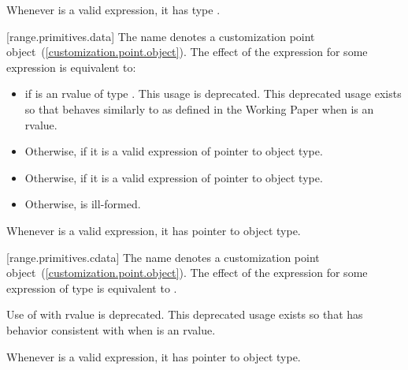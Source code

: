 \pnum
\enternote Whenever  is a valid expression, it
has type . \exitnote

[range.primitives.data]{}
\pnum
The name  denotes a customization point
object~(\ref{customization.point.object}). The effect of the expression
 for some expression  is
equivalent to:

\begin{itemize}
\item
   if  is an rvalue of
  type . This usage is deprecated. \enternote
  This deprecated usage exists so that  behaves
  similarly to  as defined in the \Cpp Working
  Paper when  is an rvalue. \exitnote

\item
  Otherwise,  if it is a valid expression of pointer to object type.

\item
  Otherwise,  if it is a valid expression of pointer to object type.

\item
  Otherwise,  is ill-formed.
\end{itemize}

\pnum
\enternote Whenever  is a valid expression, it
has pointer to object type. \exitnote

[range.primitives.cdata]{}
\pnum
The name  denotes a customization point
object~(\ref{customization.point.object}). The effect of the expression
 for some expression  of type 
is equivalent to .

\pnum
Use of  with rvalue  is deprecated.
\enternote This deprecated usage exists so that 
has behavior consistent with  when  is
an rvalue. \exitnote

\pnum
\enternote Whenever  is a valid expression, it
has pointer to object type. \exitnote
